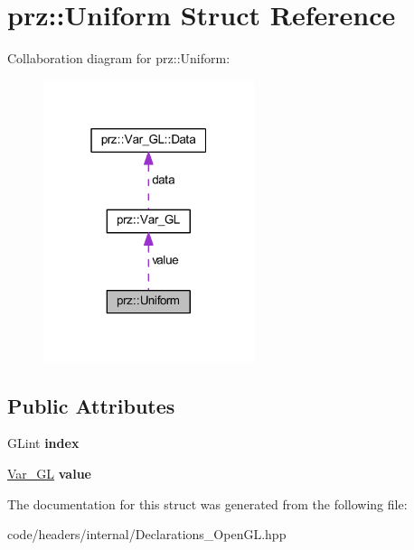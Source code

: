 \hypertarget{structprz_1_1_uniform}{}\section{prz\+::Uniform Struct Reference}
\label{structprz_1_1_uniform}


Collaboration diagram for prz\+::Uniform\+:
\nopagebreak
\begin{figure}[H]
\begin{center}
\leavevmode
\includegraphics[width=175pt]{structprz_1_1_uniform__coll__graph}
\end{center}
\end{figure}
\subsection*{Public Attributes}
\begin{DoxyCompactItemize}
\item 
\mbox{\label{structprz_1_1_uniform_ace34acef13347c5499eebc9c486b9c89}} 
G\+Lint {\bfseries index}
\item 
\mbox{\label{structprz_1_1_uniform_aea346a26149cbbae5542d6b72fa8bcb7}} 
\mbox{\hyperlink{structprz_1_1_var___g_l}{Var\+\_\+\+GL}} {\bfseries value}
\end{DoxyCompactItemize}


The documentation for this struct was generated from the following file\+:\begin{DoxyCompactItemize}
\item 
code/headers/internal/Declarations\+\_\+\+Open\+G\+L.\+hpp\end{DoxyCompactItemize}
